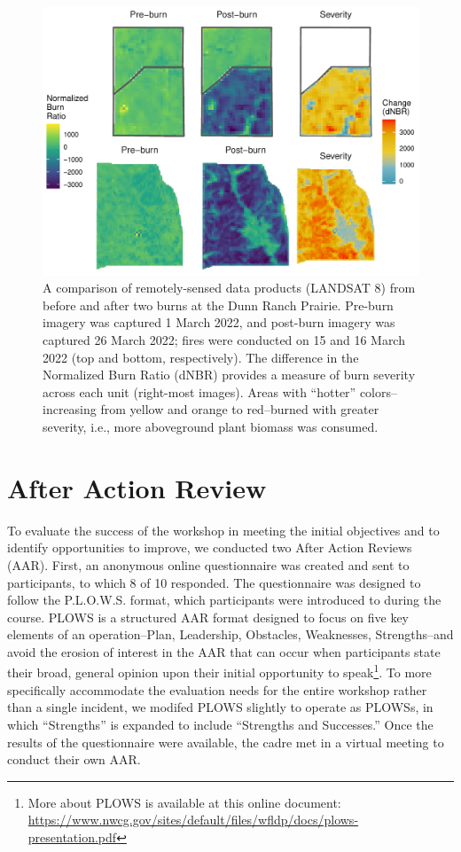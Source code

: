 \documentclass[fire,article,submit,moreauthors,pdftex]{Definitions/mdpi}
\begin{document}
\begin{figure}
\centering
\includegraphics[width=1\columnwidth]{severity_gg-1.pdf}
\caption{A comparison of remotely-sensed data products (LANDSAT 8) from before and after two burns at the Dunn Ranch Prairie. Pre-burn imagery was captured 1 March 2022, and post-burn imagery was captured 26 March 2022; fires were conducted on 15 and 16 March 2022 (top and bottom, respectively). The difference in the Normalized Burn Ratio (dNBR) provides a measure of burn severity across each unit (right-most images). Areas with ``hotter'' colors--increasing from yellow and orange to red--burned with greater severity, i.e., more aboveground plant biomass was consumed. \label{severity}}
\end{figure}

\hypertarget{after-action-review}{%
\section{After Action Review}\label{after-action-review}}

To evaluate the success of the workshop in meeting the initial objectives and to identify opportunities to improve, we conducted two After Action Reviews (AAR).
First, an anonymous online questionnaire was created and sent to participants, to which 8 of 10 responded.
The questionnaire was designed to follow the P.L.O.W.S. format, which participants were introduced to during the course.
PLOWS is a structured AAR format designed to focus on five key elements of an operation--Plan, Leadership, Obstacles, Weaknesses, Strengths--and avoid the erosion of interest in the AAR that can occur when participants state their broad, general opinion upon their initial opportunity to speak\footnote{More about PLOWS is available at this online document: \url{https://www.nwcg.gov/sites/default/files/wfldp/docs/plows-presentation.pdf}}.
To more specifically accommodate the evaluation needs for the entire workshop rather than a single incident, we modifed PLOWS slightly to operate as PLOWSs, in which ``Strengths'' is expanded to include ``Strengths and Successes.''
Once the results of the questionnaire were available, the cadre met in a virtual meeting to conduct their own AAR.
\end{document}
